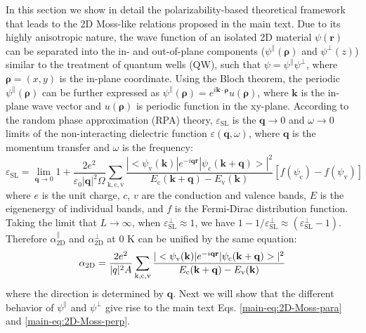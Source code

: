 \documentclass[journal=ancac3,email=true,hyperref=true,keywords=false]{achemso}
\begin{document}
In this section we show in detail the polarizability-based theoretical
framework that leads to the 2D Moss-like relations proposed in the
main text.  Due to its highly anisotropic nature, the wave function of
an isolated 2D material $\psi(\mathbf{r})$ can be separated into the
in- and out-of-plane components ($\psi^{\parallel}(\boldsymbol{\rho})$ and $\psi^{\perp}(z)$) 
similar to the treatment of quantum
wells (QW),\cite{davies_physics_1997} such that
$\psi=\psi^{\parallel}\psi^{\perp}$, where $\boldsymbol{\rho}=(x, y)$
is the in-plane coordinate. Using the Bloch theorem, the periodic
$\psi^{\parallel}(\boldsymbol{\rho})$ can be further expressed as
$\psi^{\parallel}(\boldsymbol{\rho})=e^{i\mathbf{k} \cdot
  \boldsymbol{\rho}}u(\boldsymbol{\rho})$, where $\mathbf{k}$ is the
in-plane wave vector and $u(\boldsymbol{\rho})$ is periodic function
in the xy-plane. According to the random phase approximation (RPA)
theory\cite{Adler_1962}, $\varepsilon_{\mathrm{SL}}$ is the
$\mathbf{q} \to 0$ and $\omega \to 0$ limits of the non-interacting
dielectric function $\varepsilon(\mathbf{q}, \omega)$, where
$\mathbf{q}$ is the momentum transfer and $\omega$ is the frequency:
\begin{equation}
  \label{eq:RPA-eps2}
  \varepsilon_{\mathrm{SL}}
  = \lim_{\mathbf{q} \to 0} 1 + \frac{2e^{2}}{\varepsilon_{0} |\mathbf{q}|^{2} \Omega}
  \sum_{\mathrm{k, c, v}}
  \frac{|<\psi_{\mathrm{v}}(\mathbf{k})|e^{-i\mathbf{q}\mathbf{r}}|\psi_{\mathrm{c}}(\mathbf{k+q})>|^{2}}
  {E_{\mathrm{c}}(\mathbf{k+q}) - E_{\mathrm{v}}(\mathbf{k})}
  \left[f(\psi_{\mathrm{c}}) - f(\psi_{\mathrm{v}})\right]
\end{equation}
where $e$ is the unit charge, $c$, $v$ are the conduction and valence
bands, $E$ is the eigenenergy of individual bands, and $f$ is the
Fermi-Dirac distribution function. Taking the
limit that $L\to\infty$, when
$\varepsilon^{\perp}_{\mathrm{SL}} \approx 1$, we have
$1-1/\varepsilon^{\perp}_{\mathrm{SL}} \approx
(\varepsilon_{\mathrm{SL}}^{\perp} - 1)$. Therefore
$\alpha_{\mathrm{2D}}^{\parallel}$ and $\alpha_{\mathrm{2D}}^{\perp}$
at 0 K can be unified by the same equation:
\begin{equation}
  \label{eq:alpha-RPA}
  \alpha_{\rm 2D} = \frac{2e^{2}}{|q|^{2}A} \sum_{\mathrm{k,c,v}}
  \frac{|<\psi_{\mathrm{v}}(\mathbf{k})|e^{-i\mathbf{q}\mathbf{r}}|\psi_{\mathrm{c}}(\mathbf{k+q})>|^{2}}
  {E_{\mathrm{c}}(\mathbf{k+q}) - E_{\mathrm{v}}(\mathbf{k})}
\end{equation}
where the direction is determined by $\mathbf{q}$. Next we will show
that the different behavior of $\psi^{\parallel}$ and $\psi^{\perp}$
give rise to the main text Eqs. \ref{main-eq:2D-Moss-para} and
\ref{main-eq:2D-Moss-perp}.
\end{document}
